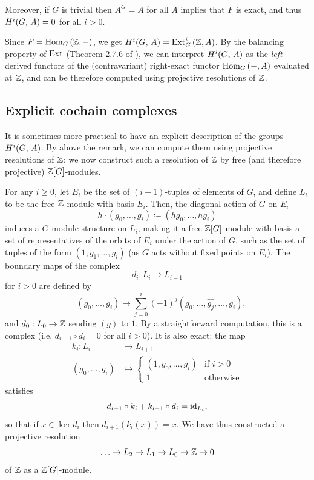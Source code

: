 \documentclass[a4paper, oneside]{memoir}
\begin{document}
\noindent Moreover, if $G$ is trivial then $A^G=A$ for all $A$ implies that $F$ is exact, and thus $H^{i}( G, \, A )=0$ for all $i>0$.

\begin{remark}
	Since $F=\operatorname{Hom}_G{(\mathbb{Z},-)}$, we get $H^{i}( G, \, A )=\operatorname{Ext}^i_G{(\mathbb{Z},A)}$. By the balancing property of $\operatorname{Ext}$ (Theorem 2.7.6 of \cite{Weibel}), we can interpret $H^{i}( G, \, A )$ as the \textit{left} derived functors of the (contravariant) right-exact functor $\operatorname{Hom}_G{(-,A)}$ evaluated at $\mathbb{Z}$, and can be therefore computed using projective resolutions of $\mathbb{Z}$.
\end{remark}

\subsection{Explicit cochain complexes}

It is sometimes more practical to have an explicit description of the groups $H^{i}( G, \, A )$. By above the remark, we can compute them using projective resolutions of $\mathbb{Z}$; we now construct such a resolution of $\mathbb{Z}$ by free (and therefore projective) $\mathbb{Z}[G]$-modules.

For any $i\geq 0$, let $E_i$ be the set of $(i+1)$-tuples of elements of $G$, and define $L_i$ to be the free $\mathbb{Z}$-module with basis $E_i$. Then, the diagonal action of $G$ on $E_i$
\[
	h\cdot (g_0,\dots , g_i) \coloneqq (h g_0 ,\dots , h g_{i} )
\]
induces a $G$-module structure on $L_i$, making it a free $\mathbb{Z}[G]$-module with basis a set of representatives of the orbits of $E_i$ under the action of $G$, such as the set of tuples of the form $(1,g_1,\dots , g_i)$ (as $G$ acts without fixed points on $E_i$). The boundary maps of the complex
\[
	d_i: L_i \to L_{i-1}
\]
for $i>0$ are defined by
\[
	\quad (g_0,\dots , g_i) \mapsto \sum_{j=0}^{i} (-1)^j (g_0,\dots , \hat{g_j},\dots , g_i),
\]
and $d_0:L_0\to\mathbb{Z}$ sending $(g)$ to $1$. By a straightforward computation, this is a complex (i.e. $d_{i-1}\circ d_i=0$ for all $i>0$). It is also exact: the map
\begin{align*}
	k_i: L_i          & \to L_{i+1} \\
	(g_0,\dots , g_i) & \mapsto
	\begin{cases}
		(1,g_0,\dots , g_i) & \text{if } i>0   \\
		1                   & \text{otherwise}
	\end{cases}
\end{align*}
satisfies
\[
	d_{i+1}\circ k_i + k_{i-1}\circ d_i = \operatorname{id}_{L_i},
\]
so that if $x\in\ker{d_i}$ then $d_{i+1}(k_i(x))=x$.
We have thus constructed a projective resolution
\[
	\ldots\to L_2\to L_1\to L_0\to\mathbb{Z}\to 0
\]
of $\mathbb{Z}$ as a $\mathbb{Z}[G]$-module.
\end{document}
